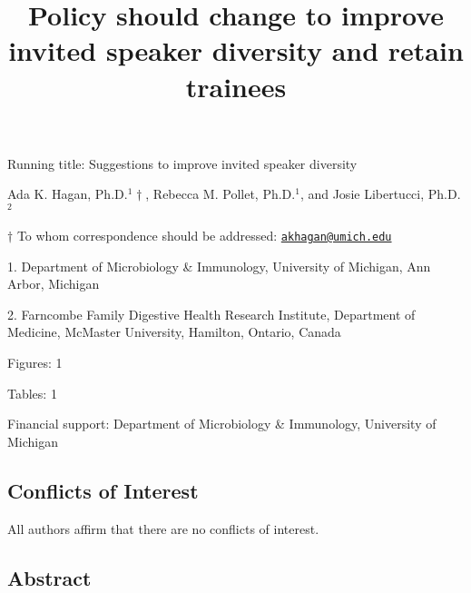 \documentclass[10pt,]{article}
\title{\textbf{Policy should change to improve invited speaker diversity and
retain trainees}}
\author{}
\date{}
\begin{document}
\maketitle

\vspace{30mm}

Running title: Suggestions to improve invited speaker diversity

\vspace{35mm}

Ada K. Hagan, Ph.D.\({^1\dagger}\), Rebecca M. Pollet, Ph.D.\({^1}\),
and Josie Libertucci, Ph.D.\({^2}\)

\vspace{35mm}

\(\dagger\) To whom correspondence should be addressed:
\href{mailto:akhagan@umich.edu}{\nolinkurl{akhagan@umich.edu}}

1. Department of Microbiology \& Immunology, University of Michigan, Ann
Arbor, Michigan

2. Farncombe Family Digestive Health Research Institute, Department of
Medicine, McMaster University, Hamilton, Ontario, Canada

Figures: 1

Tables: 1

Financial support: Department of Microbiology \& Immunology, University
of Michigan

\newpage

\subsection{Conflicts of Interest}\label{conflicts-of-interest}

\vspace{40mm}

All authors affirm that there are no conflicts of interest.

\newpage

\linenumbers

\subsection{Abstract}\label{abstract}
\end{document}
